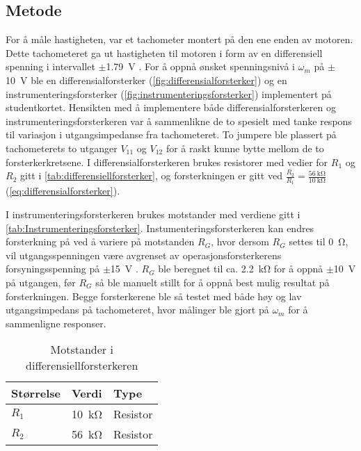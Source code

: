 \subsection{Metode}

For å måle hastigheten, var et tachometer montert på den ene enden av motoren. Dette tachometeret ga ut hastigheten til motoren i form av en differensiell spenning i intervallet $\pm${\SI{1.79}{\volt}} . For å oppnå ønsket spenningsnivå i $\omega_m$ på $\pm${\SI{10}{\volt}} ble en differensialforsterker (\autoref{fig:differensialforsterker}) og en instrumenteringsforsterker (\autoref{fig:instrumenteringsforsterker}) implementert på studentkortet.
Hensikten med å implementere både differensialforsterkeren og instrumenteringsforsterkeren var å sammenlikne de to spesielt med tanke respons til variasjon i utgangsimpedanse fra tachometeret.
To jumpere ble plassert på tachometerets to utganger $V_{11}$ og $V_{12}$ for å raskt kunne bytte mellom de to forsterkerkretsene. I differensialforsterkeren brukes resistorer med vedier for $R_1$ og $R_2$ gitt i \autoref{tab:differensiellforsterker}, og forsterkningen er gitt ved $\frac{R_2}{R_1} = \frac{\SI{56}{\kilo\ohm}}{\SI{10}{\kilo\ohm}}$(\autoref{eq:differensialforsterker}).

I instrumenteringsforsterkeren brukes motstander med verdiene gitt i \autoref{tab:Instrumenteringsforsterker}. Instumenteringsforsterkeren kan endres forsterkning på ved å variere på motstanden $R_G$, hvor dersom $R_G$ settes til {\SI{0}{\ohm}}, vil utgangsspenningen være avgrenset av operasjonsforsterkerens forsyningsspenning på $\pm${\SI{15}{\volt}} . $R_G$ ble beregnet til ca. {\SI{2.2}{\kilo\ohm}} for å oppnå $\pm${\SI{10}{\volt}} på utgangen, før $R_G$ så ble manuelt stillt for å oppnå best mulig resultat på forsterkningen. Begge forsterkerene ble så testet med både høy og lav utgangsimpedans på tachometeret, hvor målinger ble gjort på $\omega_m$ for å sammenligne responser.

\begin{table}[h]
	\centering
    \caption{Motstander i differensiellforsterkeren}
	\begin{tabular}{lll}
		\toprule
		Størrelse & Verdi & Type \\
		\midrule
        $R_1$ & \SI{10}{\kilo\ohm} & Resistor \\
        $R_2$ & \SI{56}{\kilo\ohm} & Resistor\\
		\bottomrule
	\end{tabular}
\label{tab:differensiellforsterker}
\end{table}

